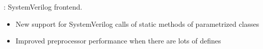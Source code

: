 
\begin{frame}

\implibtitle

: SystemVerilog frontend.
\begin{itemize}
\item New support for SystemVerilog calls of static methods of parametrized classes
\item Improved preprocessor performance when there are lots of defines
\end{itemize}
\end{frame}



